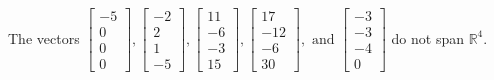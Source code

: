 \begin{exercise}
\begin{exerciseStatement}
  \end{exerciseStatement}
  \begin{exerciseAnswer}
   The vectors \(\left[\begin{array}{r}
-5 \\
0 \\
0 \\
0
\end{array}\right] , \left[\begin{array}{r}
-2 \\
2 \\
1 \\
-5
\end{array}\right] , \left[\begin{array}{r}
11 \\
-6 \\
-3 \\
15
\end{array}\right] , \left[\begin{array}{r}
17 \\
-12 \\
-6 \\
30
\end{array}\right] , \text{ and } \left[\begin{array}{r}
-3 \\
-3 \\
-4 \\
0
\end{array}\right]\) 
  	 do not  
	span \(\mathbb{R}^4\).
  


  \end{exerciseAnswer}
\end{exercise}
